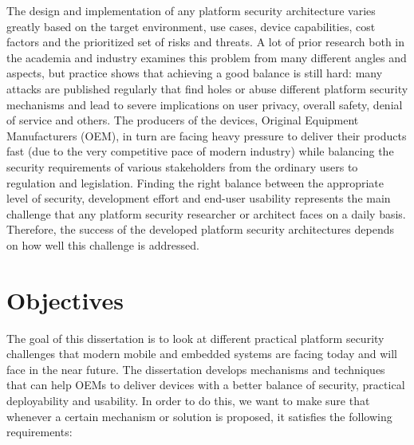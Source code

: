 The design and implementation of any platform security architecture varies greatly based on the target environment, use cases, device capabilities, cost factors and the prioritized set of risks and threats. A lot of prior research both in the academia and industry examines this problem from many different angles and aspects, but practice shows that achieving a good balance is still hard: many attacks are published regularly that find holes or abuse different platform security mechanisms and lead to severe implications on user privacy, overall safety, denial of service and others. The producers of the devices, Original Equipment Manufacturers (OEM), in turn are facing heavy pressure to deliver their products fast (due to the very competitive pace of modern industry) while balancing the security requirements of various stakeholders from the ordinary users to regulation and legislation. Finding the right balance between the appropriate level of security, development effort and end-user usability represents the main challenge that any platform security researcher or architect faces on a daily basis. Therefore, the success of the developed platform security architectures depends on how well this challenge is addressed.   

\section{Objectives}
\label{sec:Objectives}

The goal of this dissertation is to look at different practical platform security challenges that modern mobile and embedded systems are facing today and will face in the near future. The dissertation develops mechanisms and techniques that can help OEMs to deliver devices with a better balance of security, practical deployability and usability. In order to do this, we want to make sure that whenever a certain mechanism or solution is proposed, it satisfies the following requirements:

